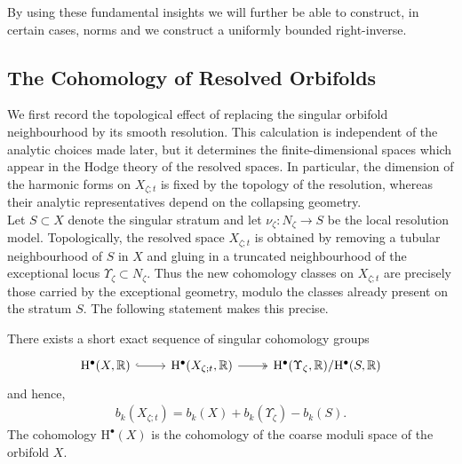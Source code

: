 \documentclass[psamsfonts]{amsart}
\theoremstyle{plain}
\theoremstyle{definition}{
\newtheorem{defi}{Definition}[section]
\newtheorem{ass}{Assumption}
\newtheorem*{nota}{Notation}}
\theoremstyle{remark}{
\newtheorem{rem}{Remark}
\newtheorem{ex}{Example}}
\theoremstyle{plain}{
\newtheorem{thm}{Theorem}[section]
\newtheorem{lem}{Lemma}[section]
\newtheorem{cor}{Corollary}[section]
\newtheorem{prop}{Proposition}[section]
\newtheorem{con}{Conjecture}[section]}
\newcommand{\m}[1]{{\mathrm{#1}}}
\begin{document}
By using these fundamental insights we will further be able to construct, in certain cases,  norms and we construct a uniformly bounded right-inverse.

\subsection{The Cohomology of Resolved Orbifolds}
\label{The Cohomology of Resolved Orbifolds}

We first record the topological effect of replacing the singular orbifold neighbourhood by its smooth resolution. This calculation is independent of the analytic choices made later, but it determines the
finite-dimensional spaces which appear in the Hodge theory of the resolved spaces. In particular, the dimension of the harmonic forms on $X_{\zeta;t}$ is fixed by the topology of the resolution, whereas their
analytic representatives depend on the collapsing geometry.\\

Let $S\subset X$ denote the singular stratum and let $\nu_\zeta\colon N_\zeta\rightarrow S$ be the local resolution model. Topologically, the resolved space $X_{\zeta;t}$ is obtained by removing a tubular neighbourhood of $S$ in $X$ and gluing in a truncated neighbourhood of the exceptional locus
$\Upsilon_\zeta\subset N_\zeta$. Thus the new cohomology classes on $X_{\zeta;t}$ are precisely those carried by the exceptional geometry, modulo the classes already present on the stratum $S$. The following
statement makes this precise.
\begin{prop}
\label{cohomofXt}
There exists a short exact sequence of singular cohomology groups
\begin{equation*}
    \begin{tikzcd}
        \m{H}^\bullet(X,\mathbb{R})\arrow[r,hook]&\m{H}^\bullet(X_{\zeta;t},\mathbb{R})\arrow[r,two heads]&\m{H}^\bullet(\Upsilon_\zeta,\mathbb{R})/\m{H}^\bullet(S,\mathbb{R})
    \end{tikzcd}
\end{equation*}
and hence, 
\begin{align*}
    b_k(X_{\zeta;t})=b_k(X)+b_k(\Upsilon_\zeta)-b_k(S).
\end{align*}
The cohomology $\m{H}^\bullet(X)$ is the cohomology of the coarse moduli space of the orbifold $X$.
\end{prop}
\end{document}
